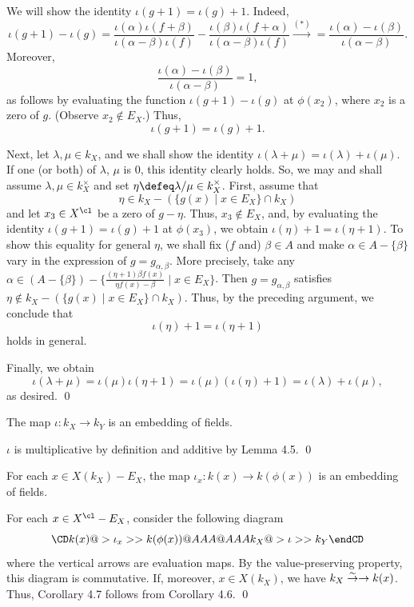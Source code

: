 We will show the identity $\iota (g+1)=\iota (g)+1$. Indeed, 
$$\iota (g+1)-\iota (g)
=\frac {\iota (\alpha) \iota (f+\beta)}
{\iota (\alpha-\beta) \iota (f)}-\frac {\iota (\beta)\iota (f+\alpha)}
{\iota (\alpha-\beta) \iota (f)}
\overset{(*)}\to=\frac {\iota (\alpha)-\iota (\beta)}
{\iota (\alpha-\beta)}.$$ 
Moreover, 
$$\frac {\iota (\alpha)-\iota (\beta)}{\iota (\alpha-\beta)}=1,$$ 
as follows by evaluating the function $\iota (g+1)-\iota (g)$ at 
$\phi (x_2)$,
where $x_2$ is a zero of $g$. 
(Observe $x_2\notin E_X$.) 
Thus, 
$$\iota (g+1)=\iota (g)+1.$$ 

Next, let $\lambda, \mu\in k_X$, and we shall show the identity 
$\iota (\lambda+\mu)=\iota (\lambda)+\iota (\mu)$. 
If one (or both) of $\lambda$, $\mu$ is $0$, this identity 
clearly holds. So, we may and shall assume 
$\lambda,\mu\in k_X^{\times}$ and 
set $\eta\defeq \lambda/\mu\in k_X^{\times}$. First, 
assume that 
$$\eta \in k_X-(\{g(x)\mid x\in E_X\}\cap k_X)$$
and let $x_3\in X^{\cl}$ be a zero of $g-\eta$. 
Thus, $x_3\notin E_X$, and, by evaluating the identity 
$\iota (g+1)=\iota (g)+1$ at $\phi(x_3)$, we obtain 
$\iota (\eta)+1=\iota (\eta+1)$. 
To show this equality for general $\eta$, 
we shall fix ($f$ and) $\beta\in A$ and make 
$\alpha\in A-\{\beta\}$ vary 
in the expression of $g=g_{\alpha,\beta}$. 
More precisely, take any 
$\alpha\in (A-\{\beta\})-\{\frac{(\eta+1)\beta f(x)}{\eta f(x)-\beta}\mid x\in E_X\}$. 
Then $g=g_{\alpha,\beta}$ satisfies 
$\eta \notin k_X - (\{g(x)\mid x\in E_X\}\cap k_X)$. 
Thus, by the preceding argument, we conclude that 
$$\iota (\eta)+1=\iota (\eta+1)$$ 
holds in general. 

Finally, we obtain
$$\iota (\lambda+\mu)
=\iota (\mu)\iota (\eta +1)
=\iota (\mu) (\iota (\eta)+1)
=\iota (\lambda)+\iota (\mu),$$
as desired. 
\qed
\enddemo

The map $\iota: k_X\to k_Y$ is an embedding of fields. 
\endproclaim

$\iota$ is multiplicative by definition and additive by Lemma 4.5. 
\qed\enddemo

For each $x\in X(k_X)-E_X$, the map 
$\iota_x: k(x) \to k(\phi(x))$ is an embedding of fields. 
\endproclaim

For each $x\in X^{\cl}-E_X$, consider the following diagram
$$
\CD
k(x) @>{\iota_x}>> k(\phi(x)) \\
@AAA @AAA \\
k_X @>{\iota}>> k_Y \\
\endCD
$$
where the vertical arrows are evaluation maps. By the value-preserving 
property, this diagram is commutative. If, moreover, $x\in X(k_X)$, 
we have $k_X\overset \sim \to \rightarrow k(x)$. Thus, Corollary 4.7 follows from Corollary 4.6. 
\qed\enddemo

